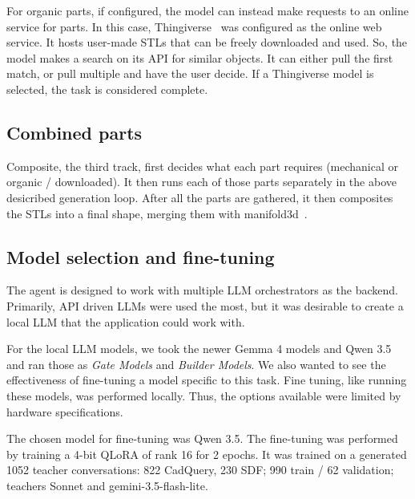 For organic parts, if configured, the model can instead make requests to an online service for parts.
In this case, Thingiverse~\cite{thingiverse} was configured as the online web service. It hosts user-made STLs that can be freely downloaded and used.
So, the model makes a search on its API for similar objects.
It can either pull the first match, or pull multiple and have the user decide.
If a Thingiverse model is selected, the task is considered complete.

\subsection{Combined parts}

Composite, the third track, first decides what each part requires (mechanical or organic / downloaded).
It then runs each of those parts separately in the above desicribed generation loop.
After all the parts are gathered, it then composites the STLs into a final shape, merging them with manifold3d~\cite{manifold3d}.


\subsection{Model selection and fine-tuning}
\label{sec:finetune}

The agent is designed to work with multiple LLM orchestrators as the backend.
Primarily, API driven LLMs were used the most, but it was desirable to create a local LLM that the application could work with.

For the local LLM models, we took the newer Gemma 4 models and Qwen 3.5 and ran those as \textit{Gate Models} and \textit{Builder Models}.
We also wanted to see the effectiveness of fine-tuning a model specific to this task.
Fine tuning, like running these models, was performed locally. Thus, the options available were limited by hardware specifications.

The chosen model for fine-tuning was Qwen 3.5. The fine-tuning was performed by training a 4-bit QLoRA of rank 16 for 2 epochs.
It was trained on a generated 1052 teacher conversations: 822 CadQuery, 230 SDF; 990 train / 62 validation; teachers Sonnet and gemini-3.5-flash-lite.